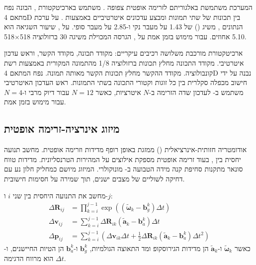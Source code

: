 המערכת משתמשת באלגוריתם  לזרימה אופטית צפופה \cite{CrewAIDocs}.  משתמש בארכיטקטורת , הבונה נפח מתאם 4D בין תכונות של שתי תמונות ומבצע עדכונים איטרטיביים באמצעות . על ערכת הנתונים ,  משיג  () של 1.43 על מעבר נקי ו-2.85 על מעבר סופי. על , שיעור השגיאה  הוא 5.10 אחוזים. עבור מימוש בזמן אמת על , הגרסה המכוילת  משיגה 30  ברזולוציה 518$\times$518.

ארכיטקטורת  מורכבת משלושה רכיבים עיקריים: מקודד תכונה, מקודד הקשר, וראש עדכון איטרטיבי. מקודד התכונה מחלץ תכונות ברזולוציה 1/8 מהתמונה המקורית באמצעות רשת קונבולוציה. מקודד ההקשר מחלץ תכונות הקשר מאותה תמונה. נפח המתאם 4D נבנה על ידי חישוב מכפלה סקלרית בין כל זוגות וקטורי התכונה בשתי התמונות. ראש העדכון האיטרטיבי משתמש ב- לעדכון שדה הזרימה ב-$N$ איטרציות, כאשר $N=12$ עבור דיוק מרבי ו-$N=4$ עבור מימוש בזמן אמת.

\subsection{מיזוג אינרציה-זרימה אופטית}
\label{sec:ch06_visual_inertial_fusion}

אודומטריה חזותית-אינרציאלית () ממזגת באופן רופף מדידות  וזרימה אופטית.  מחשב תנועה יחסית בין , בעוד זרימה אופטית מספקת אילוצים על המהירות הטרנסליונית. מדידות טווח סונאר מתקנות סחיפת קנה מידה הטבועה ב- מונוקולרי. המיזוג מיושם כמחליק חלון נע עם דחיקה לשוליים של מצבים ישנים, תוך שמירה על חסימות חישובית.

 מחשב את התנועה היחסית בין שני  $i$ ו-$j$:
\begin{align}
\Delta \mathbf{R}_{ij} &= \prod_{k=i}^{j-1} \exp\left( (\tilde{\boldsymbol{\omega}}_k - \mathbf{b}_g^k) \Delta t \right) \\
\Delta \mathbf{v}_{ij} &= \sum_{k=i}^{j-1} \Delta \mathbf{R}_{ik} (\tilde{\mathbf{a}}_k - \mathbf{b}_a^k) \Delta t \\
\Delta \mathbf{p}_{ij} &= \sum_{k=i}^{j-1} \left( \Delta \mathbf{v}_{ik} \Delta t + \frac{1}{2} \Delta \mathbf{R}_{ik} (\tilde{\mathbf{a}}_k - \mathbf{b}_a^k) \Delta t^2 \right)
\label{eq:ch06_imu_preintegration}
\end{align}
כאשר $\tilde{\boldsymbol{\omega}}_k$ ו-$\tilde{\mathbf{a}}_k$ הן מדידות הגירוסקופ ומד התאוצה הגולמיות, $\mathbf{b}_g^k$ ו-$\mathbf{b}_a^k$ הן הטיות החיישנים, ו-$\Delta t$ הוא מרווח הדגימה.

